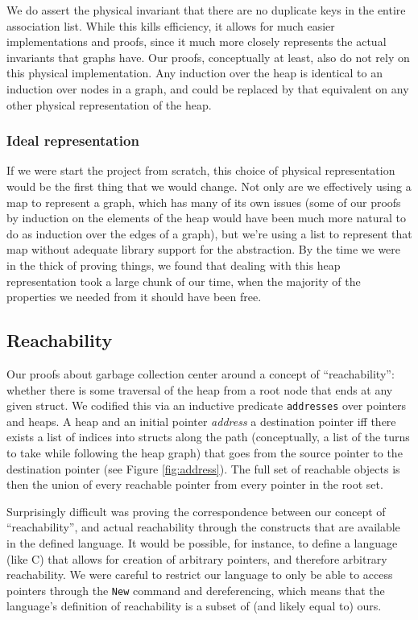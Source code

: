 \documentclass{article}
\begin{document}
We do assert the physical invariant that there are no duplicate keys in the entire association list. While this kills efficiency, it allows for much easier implementations and proofs, since it much more closely represents the actual invariants that graphs have. Our proofs, conceptually at least, also do not rely on this physical implementation. Any induction over the heap is identical to an induction over nodes in a graph, and could be replaced by that equivalent on any other physical representation of the heap.

\subsubsection{Ideal representation}
If we were start the project from scratch, this choice of physical representation would be the first thing that we would change. Not only are we effectively using a map to represent a graph, which has many of its own issues (some of our proofs by induction on the elements of the heap would have been much more natural to do as induction over the edges of a graph), but we're using a list to represent that map without adequate library support for the abstraction. By the time we were in the thick of proving things, we found that dealing with this heap representation took a large chunk of our time, when the majority of the properties we needed from it should have been free.

\subsection{Reachability}
Our proofs about garbage collection center around a concept of ``reachability'': whether there is some traversal of the heap from a root node that ends at any given struct.
We codified this via an inductive predicate \lstinline|addresses| over pointers and heaps.
A heap and an initial pointer \textit{address} a destination pointer iff there exists a list of indices into structs along the path (conceptually, a list of the turns to take while following the heap graph) that goes from the source pointer to the destination pointer (see Figure \ref{fig:address}).
The full set of reachable objects is then the union of every reachable pointer from every pointer in the root set.

Surprisingly difficult was proving the correspondence between our concept of ``reachability'', and actual reachability through the constructs that are available in the defined language.
It would be possible, for instance, to define a language (like C) that allows for creation of arbitrary pointers, and therefore arbitrary reachability.
We were careful to restrict our language to only be able to access pointers through the \texttt{New} command and dereferencing, which means that the language's definition of reachability is a subset of (and likely equal to) ours.
\end{document}
